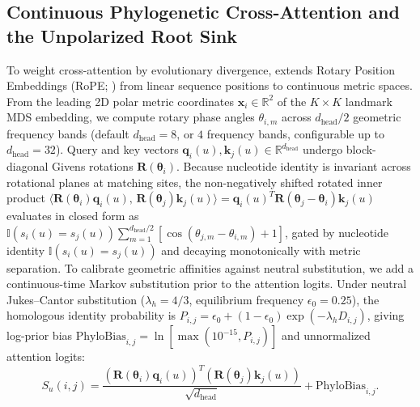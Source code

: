 \subsection{Continuous Phylogenetic Cross-Attention and the Unpolarized Root Sink}
\label{subsec:methods_attention_root}
To weight cross-attention by evolutionary divergence, \RhizAeon extends Rotary Position Embeddings (RoPE; \citealp{su2024roformer}) from linear sequence positions to continuous metric spaces. From the leading 2D polar metric coordinates $\mathbf{x}_i \in \mathbb{R}^2$ of the $K \times K$ landmark MDS embedding, we compute rotary phase angles $\theta_{i, m}$ across $d_{\text{head}}/2$ geometric frequency bands (default $d_{\text{head}} = 8$, or $4$ frequency bands, configurable up to $d_{\text{head}} = 32$). Query and key vectors $\mathbf{q}_i(u), \mathbf{k}_j(u) \in \mathbb{R}^{d_{\text{head}}}$ undergo block-diagonal Givens rotations $\mathbf{R}(\bm{\theta}_i)$. Because nucleotide identity is invariant across rotational planes at matching sites, the non-negatively shifted rotated inner product $\langle \mathbf{R}(\bm{\theta}_i) \mathbf{q}_i(u), \, \mathbf{R}(\bm{\theta}_j) \mathbf{k}_j(u) \rangle = \mathbf{q}_i(u)^T \mathbf{R}(\bm{\theta}_j - \bm{\theta}_i) \mathbf{k}_j(u)$ evaluates in closed form as $\mathbb{I}(s_i(u) = s_j(u)) \sum_{m=1}^{d_{\text{head}}/2} [\cos(\theta_{j,m} - \theta_{i,m}) + 1]$, gated by nucleotide identity $\mathbb{I}(s_i(u) = s_j(u))$ and decaying monotonically with metric separation. To calibrate geometric affinities against neutral substitution, we add a continuous-time Markov substitution prior to the attention logits. Under neutral Jukes--Cantor substitution ($\lambda_h = 4/3$, equilibrium frequency $\epsilon_0 = 0.25$), the homologous identity probability is $P_{i,j} = \epsilon_0 + (1 - \epsilon_0) \exp(-\lambda_h D_{i,j})$, giving log-prior bias $\text{PhyloBias}_{i,j} = \ln [\max(10^{-15}, P_{i,j})]$ and unnormalized attention logits:
\begin{equation}
S_u(i, j) = \frac{(\mathbf{R}(\bm{\theta}_i) \mathbf{q}_i(u))^T (\mathbf{R}(\bm{\theta}_j) \mathbf{k}_j(u))}{\sqrt{d_{\text{head}}}} + \text{PhyloBias}_{i, j}.
\label{eq:methods_logits}
\end{equation}

